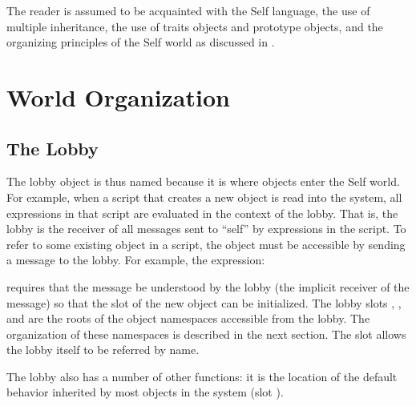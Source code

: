 \documentclass[letterpaper,10pt,english]{sphinxmanual}
\begin{document}
The reader is assumed to be acquainted with the Self language, the use of multiple inheritance,
the use of traits objects and prototype objects, and the organizing principles of the Self world as
discussed in {\hyperref[\detokenize{ref:citations}]{}}.


\section{World Organization}
\label{\detokenize{worldorg::doc}}\label{\detokenize{worldorg:world-organization}}

\subsection{The Lobby}
\label{\detokenize{worldorg:the-lobby}}
The lobby object is thus named because it is where objects enter the Self world. For example,
when a script that creates a new object is read into the system, all expressions in that script are evaluated
in the context of the lobby. That is, the lobby is the receiver of all messages sent to “self” by
expressions in the script. To refer to some existing object in a script, the object must be accessible
by sending a message to the lobby. For example, the expression:

\begin{sphinxVerbatim}[commandchars=\\\{\}]
               
\end{sphinxVerbatim}

requires that the message  be understood by the lobby (the implicit receiver of the message)
so that the  slot of the new object can be initialized. The lobby slots , ,
and  are the roots of the object namespaces accessible from the lobby. The organization of
these namespaces is described in the next section. The slot  allows the lobby itself to be referred
by name.

The lobby also has a number of other functions: it is the location of the default behavior inherited
by most objects in the system (slot ).
\end{document}
